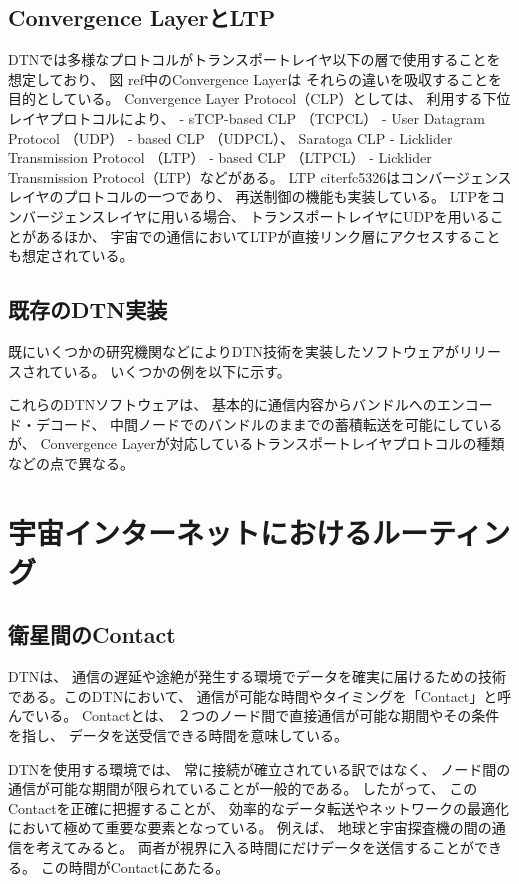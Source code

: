 \subsection{Convergence LayerとLTP}
DTNでは多様なプロトコルがトランスポートレイヤ以下の層で使用することを想定しており、 図 ref中のConvergence Layerは
それらの違いを吸収することを目的としている。 Convergence Layer Protocol（CLP）としては、 
利用する下位レイヤプロトコルにより、
- sTCP-based CLP （TCPCL）
- User Datagram Protocol （UDP）
- based CLP （UDPCL）、 Saratoga CLP
- Licklider Transmission Protocol （LTP）
- based CLP （LTPCL）
- Licklider Transmission Protocol（LTP）などがある。 
LTP citerfc5326はコンバージェンスレイヤのプロトコルの一つであり、 再送制御の機能も実装している。
 LTPをコンバージェンスレイヤに用いる場合、 トランスポートレイヤにUDPを用いることがあるほか、 
 宇宙での通信においてLTPが直接リンク層にアクセスすることも想定されている。
\subsection{既存のDTN実装}
既にいくつかの研究機関などによりDTN技術を実装したソフトウェアがリリースされている。 いくつかの例を以下に示す。 


これらのDTNソフトウェアは、 基本的に通信内容からバンドルへのエンコード・デコード、 
中間ノードでのバンドルのままでの蓄積転送を可能にしているが、 
Convergence Layerが対応しているトランスポートレイヤプロトコルの種類などの点で異なる。 


\section{宇宙インターネットにおけるルーティング}
\subsection{衛星間のContact}
DTNは、 通信の遅延や途絶が発生する環境でデータを確実に届けるための技術である。このDTNにおいて、
 通信が可能な時間やタイミングを「Contact」と呼んでいる。 Contactとは、 
 ２つのノード間で直接通信が可能な期間やその条件を指し、 データを送受信できる時間を意味している。

DTNを使用する環境では、 常に接続が確立されている訳ではなく、 ノード間の通信が可能な期間が限られていることが一般的である。
したがって、 このContactを正確に把握することが、 効率的なデータ転送やネットワークの最適化において極めて重要な要素となっている。
例えば、 地球と宇宙探査機の間の通信を考えてみると。 両者が視界に入る時間にだけデータを送信することができる。 この時間がContactにあたる。 

